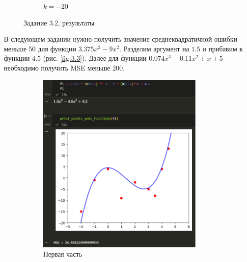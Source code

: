 \documentclass[14pt,a4paper]{extarticle}
\begin{document}
\begin{figure}[h!]
\begin{subfigure}{.5\textwidth}
        \caption{$k=-20$}
        \label{fig:3.2-2}
    \end{subfigure}

    \caption{Задание 3.2, результаты}
    \label{fig:2.1}
\end{figure}

        В следующем задании нужно получить значение среднеквадратичной
ошибки меньше 50 для функции $3.375 x ^ 3 - 9 x^2$. Разделим аргумент на $1.5$ и
прибавим к функции $4.5$ (рис. \ref{fig:3.3}). Далее для функции $0.074 x^3 - 0.11 x^2 + x + 5$
необходимо получить MSE меньше 200.

\begin{figure}[h!]
    \begin{subfigure}{.5\textwidth}
        \centering
        \includegraphics[width=0.9\textwidth]{figures/3.3-1.png}
        \caption{Первая часть}
        \label{fig:3.3.1}
    \end{subfigure}%
    \begin{subfigure}{.5\textwidth}
        \centering

\end{subfigure}
\end{figure}
\end{document}
